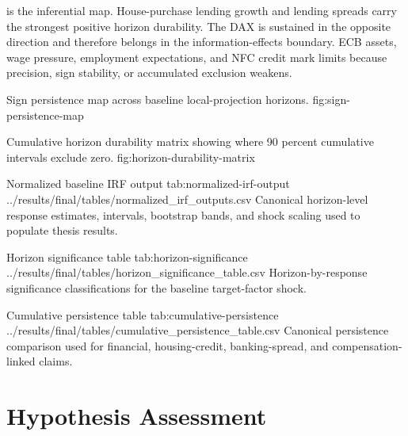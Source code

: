  is the inferential map. House-purchase lending growth and lending spreads carry the strongest positive horizon durability. The DAX is sustained in the opposite direction and therefore belongs in the information-effects boundary. ECB assets, wage pressure, employment expectations, and NFC credit mark limits because precision, sign stability, or accumulated exclusion weakens.

  {Sign persistence map across baseline local-projection horizons.}
  {fig:sign-persistence-map}

  {Cumulative horizon durability matrix showing where 90 percent cumulative intervals exclude zero.}
  {fig:horizon-durability-matrix}

\artifacttable
  {Normalized baseline IRF output}
  {tab:normalized-irf-output}
  {../results/final/tables/normalized_irf_outputs.csv}
  {Canonical horizon-level response estimates, intervals, bootstrap bands, and shock scaling used to populate thesis results.}

\artifacttable
  {Horizon significance table}
  {tab:horizon-significance}
  {../results/final/tables/horizon_significance_table.csv}
  {Horizon-by-response significance classifications for the baseline target-factor shock.}

\artifacttable
  {Cumulative persistence table}
  {tab:cumulative-persistence}
  {../results/final/tables/cumulative_persistence_table.csv}
  {Canonical persistence comparison used for financial, housing-credit, banking-spread, and compensation-linked claims.}

\section{Hypothesis Assessment}

